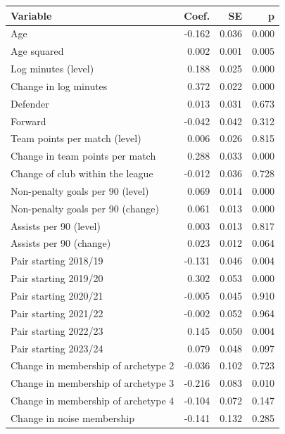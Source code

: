 \begin{tabular}{lrrr}
\toprule
Variable & Coef. & SE & p \\
\midrule
Age & -0.162 & 0.036 & 0.000 \\
Age squared & 0.002 & 0.001 & 0.005 \\
Log minutes (level) & 0.188 & 0.025 & 0.000 \\
Change in log minutes & 0.372 & 0.022 & 0.000 \\
Defender & 0.013 & 0.031 & 0.673 \\
Forward & -0.042 & 0.042 & 0.312 \\
Team points per match (level) & 0.006 & 0.026 & 0.815 \\
Change in team points per match & 0.288 & 0.033 & 0.000 \\
Change of club within the league & -0.012 & 0.036 & 0.728 \\
Non-penalty goals per 90 (level) & 0.069 & 0.014 & 0.000 \\
Non-penalty goals per 90 (change) & 0.061 & 0.013 & 0.000 \\
Assists per 90 (level) & 0.003 & 0.013 & 0.817 \\
Assists per 90 (change) & 0.023 & 0.012 & 0.064 \\
Pair starting 2018/19 & -0.131 & 0.046 & 0.004 \\
Pair starting 2019/20 & 0.302 & 0.053 & 0.000 \\
Pair starting 2020/21 & -0.005 & 0.045 & 0.910 \\
Pair starting 2021/22 & -0.002 & 0.052 & 0.964 \\
Pair starting 2022/23 & 0.145 & 0.050 & 0.004 \\
Pair starting 2023/24 & 0.079 & 0.048 & 0.097 \\
Change in membership of archetype 2 & -0.036 & 0.102 & 0.723 \\
Change in membership of archetype 3 & -0.216 & 0.083 & 0.010 \\
Change in membership of archetype 4 & -0.104 & 0.072 & 0.147 \\
Change in noise membership & -0.141 & 0.132 & 0.285 \\
\bottomrule
\end{tabular}
